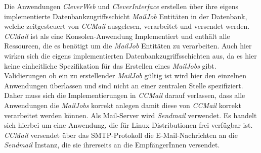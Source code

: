 \newline
\newline
Die Anwendungen \emph{CleverWeb} und \emph{CleverInterface} erstellen über ihre eigens implementierte Datenbankzugriffsschicht \emph{MailJob} Entitäten in der Datenbank, welche zeitgesteuert von \emph{CCMail} ausgelesen, verarbeitet und versendet werden. \emph{CCMail} ist als eine Konsolen-Anwendung Implementiert und enthält alle Ressourcen, die es benötigt um die \emph{MailJob} Entitäten zu verarbeiten. Auch hier wirken sich die eigens implementierten Datenbankzugriffsschichten aus, da es hier keine einheitliche Spezifikation für das Erstellen eines \emph{MailJobs} gibt. Validierungen ob ein zu erstellender \emph{MailJob} gültig ist wird hier den einzelnen Anwendungen überlassen und sind nicht an einer zentralen Stelle spezifiziert. Daher muss sich die Implementierungen in \emph{CCMail} darauf verlassen, dass alle Anwendungen die \emph{MailJobs} korrekt anlegen damit diese von \emph{CCMail} korrekt verarbeitet werden können.
\newline
\newline
Als Mail-Server wird \emph{Sendmail} verwendet. Es handelt sich hierbei um eine Anwendung, die für Linux Distributionen frei verfügbar ist. \emph{CCMail} versendet über das SMTP-Protokoll die E-Mail-Nachrichten an die \emph{Sendmail} Instanz, die sie ihrerseits an die EmpfängerInnen versendet.

\newpage
